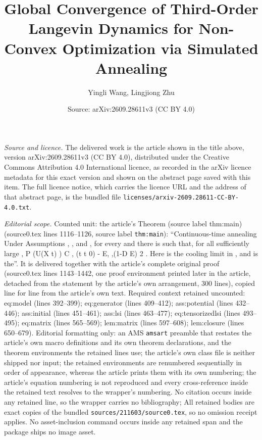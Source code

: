 \documentclass[10pt,a4paper]{amsart}
\title[Global Convergence of Third-Order Langevin Dynamics for Non-Convex Optimization via Simulated Annealing]{Global Convergence of Third-Order Langevin Dynamics for Non-Convex Optimization via Simulated Annealing}
\author{Yingli Wang, Lingjiong Zhu}
\date{Source: arXiv:2609.28611v3 (CC BY 4.0)}
\theoremstyle{plain}
\theoremstyle{definition}
\begin{document}
\maketitle

\noindent\emph{Source and licence.} The delivered work is the article shown in the title above, version arXiv:2609.28611v3 (CC BY 4.0), distributed under the Creative Commons Attribution 4.0 International licence, as recorded in the arXiv licence metadata for this exact version and shown on the abstract page saved with this item. The full licence notice, which carries the licence URL and the address of that abstract page, is the bundled file \texttt{licenses/arxiv-2609.28611-CC-BY-4.0.txt}.
\par\smallskip

\noindent\textit{Editorial scope.} Counted unit: the article's Theorem (source label thm:main) (source0.tex lines 1116--1126, source label \texttt{thm:main}): ``Continuous-time annealing Under Assumptions , , and , for every and there is such that, for all sufficiently large , P (U(X t) ) C , (t t 0) - E, ,(1-D E) 2 . Here is the cooling limit in , and is the''. It is delivered together with the article's complete original proof (source0.tex lines 1143--1442, one proof environment printed later in the article, detached from the statement by the article's own arrangement, 300 lines), copied line for line from the article's own text. Required context retained uncounted: eq:model (lines 392--399); eq:generator (lines 409--412); ass:potential (lines 432--446); ass:initial (lines 451--461); ass:lsi (lines 463--477); eq:tensorizedlsi (lines 493--495); eq:matrix (lines 565--569); lem:matrix (lines 597--608); lem:closure (lines 650--679). Editorial formatting only: an AMS \texttt{amsart} preamble that restates the article's own macro definitions and its own theorem declarations, and the theorem environments the retained lines use; the article's own class file is neither shipped nor input; the retained environments are renumbered sequentially in order of appearance, whereas the article prints them with its own numbering; the article's equation numbering is not reproduced and every cross-reference inside the retained text resolves to the wrapper's numbering. No citation occurs inside any retained line, so the wrapper carries no bibliography; All retained bodies are exact copies of the bundled \texttt{sources/211603/source0.tex}, so no omission receipt applies. No asset-inclusion command occurs inside any retained span and the package ships no image asset.
\end{document}
